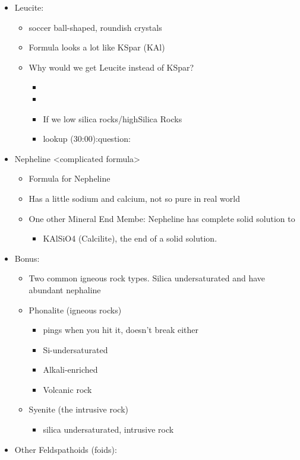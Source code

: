 \documentclass[11pt]{article}
\begin{document}
\begin{itemize}
\item Leucite: 
\begin{itemize}
\item soccer ball-shaped, roundish crystals
\item Formula looks a lot like KSpar (KAl)
\item Why would we get Leucite instead of KSpar?
\begin{itemize}
\item <write reaction>
\item <Look for Pics>
\item If we low silica rocks/highSilica Rocks
\item lookup (30:00):question:
\end{itemize}
\end{itemize}
\item Nepheline <complicated formula>
\begin{itemize}
\item Formula for Nepheline
\item Has a little sodium and calcium, not so pure in real world
\item One other Mineral End Membe: Nepheline has complete solid solution to
\begin{itemize}
\item KAlSiO4 (Calcilite), the end of a solid solution.
\end{itemize}
\end{itemize}
\item Bonus:
\begin{itemize}
\item Two common igneous rock types. Silica undersaturated and have abundant nephaline
\item Phonalite (igneous rocks)
\begin{itemize}
\item pings when you hit it, doesn't break either
\item Si-undersaturated
\item Alkali-enriched
\item Volcanic rock
\end{itemize}
\item Syenite (the intrusive rock)
\begin{itemize}
\item silica undersaturated, intrusive rock
\end{itemize}
\end{itemize}
\item Other Feldspathoids (foids):

\end{itemize}
\end{document}
